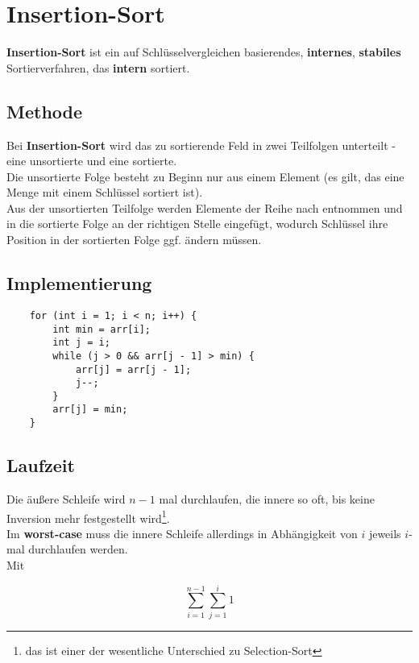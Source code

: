 \section{Insertion-Sort}

\textbf{Insertion-Sort} ist ein auf Schlüsselvergleichen basierendes, \textbf{internes}, \textbf{stabiles} Sortierverfahren, das \textbf{intern} sortiert.

\subsection{Methode}

Bei \textbf{Insertion-Sort} wird das zu sortierende Feld in zwei Teilfolgen unterteilt - eine unsortierte und eine sortierte.\\
Die unsortierte Folge besteht zu Beginn nur aus einem Element (es gilt, das eine Menge mit einem Schlüssel sortiert ist).\\
Aus der unsortierten Teilfolge werden Elemente der Reihe nach entnommen und in die sortierte Folge an der richtigen Stelle eingefügt, wodurch Schlüssel ihre Position in der sortierten Folge ggf. ändern müssen.

\subsection{Implementierung}

\begin{verbatim}
    for (int i = 1; i < n; i++) {
        int min = arr[i];
        int j = i;
        while (j > 0 && arr[j - 1] > min) {
            arr[j] = arr[j - 1];
            j--;
        }
        arr[j] = min;
    }
\end{verbatim}

\subsection{Laufzeit}
Die äußere Schleife wird $n-1$ mal durchlaufen, die innere so oft, bis keine Inversion mehr festgestellt wird\footnote{
    das ist einer der wesentliche Unterschied zu Selection-Sort
}.\\
Im \textbf{worst-case} muss die innere Schleife allerdings in Abhängigkeit von $i$ jeweils $i$-mal durchlaufen werden.\\

Mit

\begin{equation}
    \sum_{i = 1}^{n-1} \sum_{j=1}^i 1
\end{equation}

